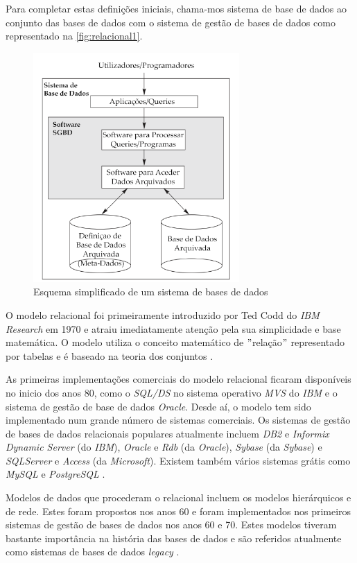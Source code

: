 \documentclass[11pt,twoside,a4paper]{report}
\begin{document}
Para completar estas definições iniciais, chama-mos sistema de base de dados ao conjunto das bases de dados com o sistema de gestão de bases de dados como representado na \autoref{fig:relacional1}.
\begin{figure}[H]
	\begin{center}
		\includegraphics[width=0.7\textwidth]{SGBD} %
		\caption[Esquema de um sistema de bases de dados]{Esquema simplificado de um sistema de bases de dados \cite{Elmasri:2010:FDS:1855347}}
		\label{fig:relacional1}
	\end{center}
\end{figure}
O modelo relacional foi primeiramente introduzido por Ted Codd do \textit{IBM Research} em 1970 \cite{Elmasri:2010:FDS:1855347,Codd} e atraiu imediatamente atenção pela sua simplicidade e base matemática. O modelo utiliza o conceito matemático de $ " $relação$ " $ representado por tabelas e é baseado na teoria dos conjuntos \cite{Elmasri:2010:FDS:1855347}.\par
As primeiras implementações comerciais do modelo relacional ficaram disponíveis no inicio dos anos 80, como o \textit{SQL/DS} no sistema operativo \textit{MVS} do \textit{IBM} e o sistema de gestão de base de dados \textit{Oracle}. Desde aí, o modelo tem sido implementado num grande número de sistemas comerciais. Os sistemas de gestão de bases de dados relacionais populares atualmente incluem \textit{DB2} e \textit{Informix Dynamic Server} (do \textit{IBM}), \textit{Oracle} e \textit{Rdb} (da \textit{Oracle}), \textit{Sybase} (da \textit{Sybase}) e \textit{SQLServer} e \textit{Access} (da \textit{Microsoft}). Existem também vários sistemas grátis como \textit{MySQL} e \textit{PostgreSQL} \cite{Elmasri:2010:FDS:1855347}.\par
Modelos de dados que procederam o relacional incluem os modelos hierárquicos e de rede. Estes foram propostos nos anos 60 e foram implementados nos primeiros sistemas de gestão de bases de dados nos anos 60 e 70. Estes modelos tiveram bastante importância na história das bases de dados e são referidos atualmente como sistemas de bases de dados \textit{legacy} \cite{Elmasri:2010:FDS:1855347}.
\end{document}
